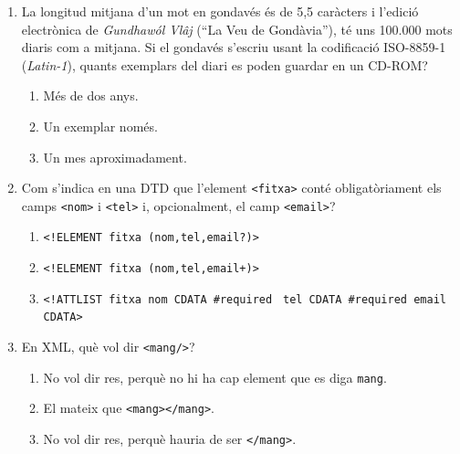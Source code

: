 \begin{enumerate}
 \item La longitud mitjana d'un mot en gondavés és de 5,5 caràcters i
   l'edició electrònica de \emph{Gundhawól Vlâj} (``La Veu de
   Gondàvia''), té uns 100.000 mots diaris com a mitjana. Si el
   gondavés s'escriu usant la codificació ISO-8859-1 (\emph{Latin-1}),
   quants exemplars del diari es poden guardar en un CD-ROM?
   \begin{enumerate}
   \item Més de dos anys.
   \item Un exemplar només.
   \item Un mes aproximadament.
   \end{enumerate}

 \item Com s'indica en una DTD que l'element \verb|<fitxa>| conté
   obligatòriament els camps \verb|<nom>| i \verb|<tel>| i,
   opcionalment, el camp \verb|<email>|?
   \begin{enumerate}
   \item \verb|<!ELEMENT fitxa (nom,tel,email?)>|
   \item \verb|<!ELEMENT fitxa (nom,tel,email+)>|
   \item \verb|<!ATTLIST fitxa nom CDATA #required| \newline
     \verb| tel CDATA #required email CDATA>|
   \end{enumerate}


 \item En XML, què vol dir \texttt{<mang/>}?
   \begin{enumerate}
   \item No vol dir res, perquè no hi ha cap element que es diga
     \texttt{mang}.
   \item El mateix que \texttt{<mang></mang>}.
   \item No vol dir res, perquè hauria de ser \texttt{</mang>}.
   \end{enumerate}


\end{enumerate}
